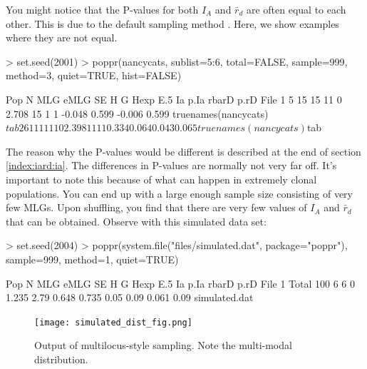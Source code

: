 \documentclass[letterpaper]{article}
\begin{document}
You might notice that the P-values for both $I_A$ and $\bar r_d$ are often equal to each other. This is due to the default sampling method \cite{Agapow:2001}. Here, we show examples where they are not equal.
\begin{Schunk}
\begin{Sinput}
> set.seed(2001)
> poppr(nancycats, sublist=5:6, total=FALSE, sample=999, method=3, quiet=TRUE, hist=FALSE)
\end{Sinput}
\end{Schunk}
\begin{Schunk}
\begin{Soutput}
  Pop  N MLG eMLG SE     H  G Hexp E.5     Ia  p.Ia  rbarD  p.rD                     File
1   5 15  15   11  0 2.708 15    1   1 -0.048 0.599 -0.006 0.599 truenames(nancycats)$tab
2   6 11  11   11  0 2.398 11    1   1  0.334 0.064  0.043 0.065 truenames(nancycats)$tab
\end{Soutput}
\end{Schunk}
The reason why the P-values would be different is described at the end of section \ref{index:iard:ia}. The differences in P-values are normally not very far off. It's important to note this because of what can happen in extremely clonal populations. You can end up with a large enough sample size consisting of very few MLGs. Upon shuffling, you find that there are very few values of $I_A$ and $\bar r_d$ that can be obtained. Observe with this simulated data set:
\begin{Schunk}
\begin{Sinput}
> set.seed(2004)
> poppr(system.file("files/simulated.dat", package="poppr"), sample=999, method=1, quiet=TRUE)
\end{Sinput}
\end{Schunk}
\begin{Schunk}
\begin{Soutput}
    Pop   N MLG eMLG SE     H    G  Hexp   E.5   Ia p.Ia rbarD p.rD          File
1 Total 100   6    6  0 1.235 2.79 0.648 0.735 0.05 0.09 0.061 0.09 simulated.dat
\end{Soutput}
\end{Schunk}
\begin{figure}[h!]
  \centering
  \caption{\footnotesize Output of multilocus-style sampling. Note the multi-modal distribution.}
  \label{simulated_dist_fig}
  \texttt{[image: simulated\_dist\_fig.png]}
\end{figure}
\newpage
\end{document}
